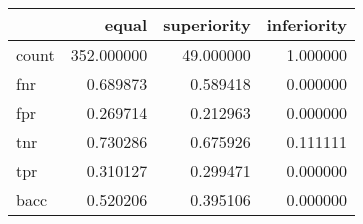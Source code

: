 \begin{tabular}{lrrr}
\toprule
{} &       equal &  superiority &  inferiority \\
\midrule
count &  352.000000 &    49.000000 &     1.000000 \\
fnr   &    0.689873 &     0.589418 &     0.000000 \\
fpr   &    0.269714 &     0.212963 &     0.000000 \\
tnr   &    0.730286 &     0.675926 &     0.111111 \\
tpr   &    0.310127 &     0.299471 &     0.000000 \\
bacc  &    0.520206 &     0.395106 &     0.000000 \\
\bottomrule
\end{tabular}
